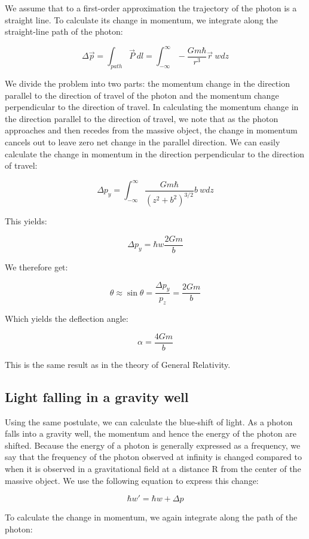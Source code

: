 \documentclass {article}
\begin{document}
We assume that to a first-order approximation the trajectory of the photon is a straight line. To calculate its change in momentum, we integrate along the straight-line path of the photon:

$$\Delta \vec p = \int_{path} \vec P ~ dl = \int_{-\infty}^{\infty} - \frac {Gm\hbar}{r^3} \vec r ~ wdz $$

We divide the problem into two parts: the momentum change in the direction parallel to the direction of travel of the photon and the momentum change perpendicular to the direction of travel. In calculating the momentum change in the direction parallel to the direction of travel, we note that as the photon approaches and then recedes from the massive object, the change in momentum cancels out to leave zero net change in the parallel direction. We can easily calculate the change in momentum in the direction perpendicular to the direction of travel:

$$\Delta p_y = \int_{-\infty}^{\infty}  \frac {Gm\hbar}{(z^2 + b^2)^{3/2}} b ~ wdz $$

This yields:

$$\Delta p_y = \hbar w \frac {2Gm} b$$

We therefore get:

$$\theta \approx \sin \theta = \frac {\Delta p_y}{p_z} = \frac {2Gm} b$$

Which yields the deflection angle:

$$\alpha = \frac {4Gm} b$$

This is the same result as in the theory of General Relativity.

\newpage
\subsection{Light falling in a gravity well}

Using the same postulate, we can calculate the blue-shift of light. As a photon falls into a gravity well, the momentum and hence the energy of the photon are shifted. Because the energy of a photon is generally expressed as a frequency, we say that the frequency of the photon observed at infinity is changed compared to when it is observed in a gravitational field at a distance R from the center of the massive object. We use the following equation to express this change:

$$\hbar w' = \hbar w + \Delta p $$

To calculate the change in momentum, we again integrate along the path of the photon:
\end{document}
